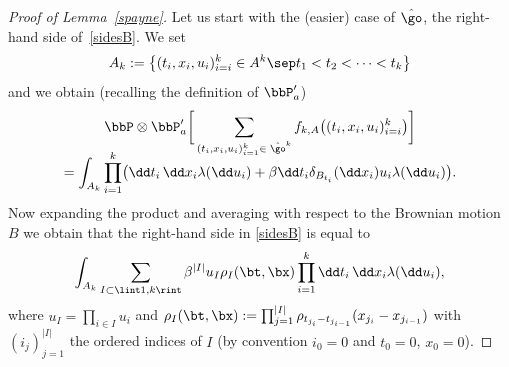 \begin{proof}[Proof of Lemma~\ref{spayne}]
Let us start with the (easier) case of $\hat \go$, \ie the right-hand side of~\eqref{sidesB}.
We set
\[
A_k:= \bigl\{ (t_i,x_i,u_i)_{i=i}^k\in A^k \sep t_1<t_2<\dots<t_k \bigr\}
\]
and we obtain (recalling the definition of $\bbP'_a$)\vspace*{-5pt}
\begin{multline*}
\bbP\otimes \bbP'_a \bigg[ \sum_{(t_i,x_i,u_i)_{i=1}^k\in \; \hat \go^k} f_{k,A} \bigl((t_i,x_i,u_i)_{i=i}^k \bigr) \bigg]\\[-8pt]
= \int_{A_k} \prod_{i=1}^k\bigl(\dd t_i\,\dd x_i \lambda (\dd u_i) + \beta \dd t_i \delta_{B_{t_i}}(\dd x_i) u_i \lambda (\dd u_i) \bigr).
\end{multline*}
Now expanding the product and averaging with respect to the Brownian motion~$B$ we obtain that the
right-hand side in \eqref{sidesB} is equal to
\begin{equation}
\label{rhsofsides}
\int_{A_k} \sum_{I\subset\lint 1,k\rint}\beta^{|I|} u_I \rho_I(\bt,\bx) \prod_{i=1}^k \dd t_i\,\dd x_i \lambda (\dd u_i),
\end{equation}
where $u_I=\prod_{i\in I} u_i$ and $\rho_I(\bt, \bx):= \prod_{j=1}^{|I|} \rho_{t_{j_{i}}- t_{j_{i-1}}}(x_{j_{i}}-x_{j_{i-1}})$ with
$(i_j)_{j=1}^{|I|}$ the ordered indices of $I$ (by convention $i_0=0$ and $t_0=0$, $x_0=0$).


\end{proof}
